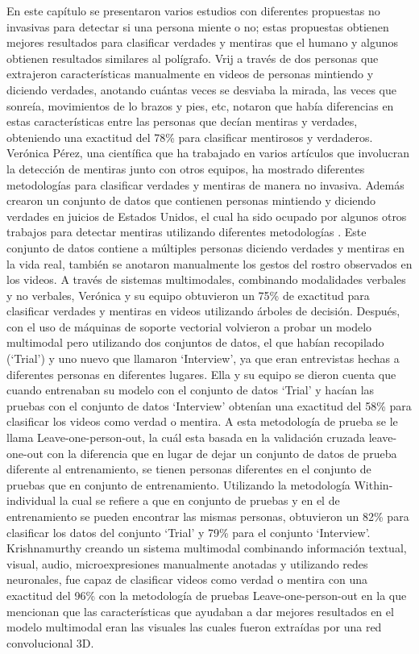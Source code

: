 \begin{onehalfspacing}
En este capítulo se presentaron varios estudios con diferentes propuestas no invasivas para detectar si una persona miente o no; estas propuestas obtienen mejores resultados para clasificar verdades y mentiras que el humano y algunos obtienen resultados similares al polígrafo. Vrij \cite{Vrij2000DetectingBehavior} a través de dos personas que extrajeron características manualmente en videos de personas mintiendo y diciendo verdades, anotando cuántas veces se desviaba la mirada, las veces que sonreía, movimientos de lo brazos y pies, etc, notaron que había diferencias en estas características entre las personas que decían mentiras y verdades, obteniendo una exactitud del 78\% para clasificar mentirosos y verdaderos. Verónica Pérez, una científica que ha trabajado en varios artículos que involucran la detección de mentiras junto con otros equipos, ha mostrado diferentes metodologías para clasificar verdades y mentiras de manera no invasiva. Además crearon un conjunto de datos que contienen personas mintiendo y diciendo verdades en juicios de Estados Unidos, el cual ha sido ocupado por algunos otros trabajos para detectar mentiras utilizando diferentes metodologías \cite{Perez-Rosas2015VerbalDetection,Abouelenien2016AnalyzingApproach}. Este conjunto de datos contiene a múltiples personas diciendo verdades y mentiras en la vida real, también se anotaron manualmente los gestos del rostro observados en los videos. A través de sistemas multimodales, combinando modalidades verbales y no verbales, Verónica y su equipo obtuvieron un 75\% de exactitud para clasificar verdades y mentiras en videos utilizando árboles de decisión. Después, con el uso de máquinas de soporte vectorial volvieron a probar un modelo multimodal pero utilizando dos conjuntos de datos, el que habían recopilado (`Trial') y uno nuevo que llamaron `Interview', ya que eran entrevistas hechas a diferentes personas en diferentes lugares. Ella y su equipo se dieron cuenta que cuando entrenaban su modelo con el conjunto de datos `Trial' y hacían las pruebas con el conjunto de datos `Interview' obtenían una exactitud del 58\% para clasificar los videos como verdad o mentira. A esta metodología de prueba se le llama Leave-one-person-out, la cuál esta basada en la validación cruzada leave-one-out con la diferencia que en lugar de dejar un conjunto de datos de prueba diferente al entrenamiento, se tienen personas diferentes en el conjunto de pruebas que en conjunto de entrenamiento. Utilizando la metodología Within-individual la cual se refiere a que en conjunto de pruebas y en el de entrenamiento se pueden encontrar las mismas personas, obtuvieron un 82\% para clasificar los datos del conjunto `Trial' y 79\% para el conjunto `Interview'. Krishnamurthy \cite{KrishnamurthyADetection} creando un sistema multimodal combinando información textual, visual, audio, microexpresiones manualmente anotadas y utilizando redes neuronales, fue capaz de clasificar videos como verdad o mentira con una exactitud del 96\% con la metodología de pruebas Leave-one-person-out en la que mencionan que las características que ayudaban a dar mejores resultados en el modelo multimodal eran las visuales las cuales fueron extraídas por una red convolucional 3D.

\end{onehalfspacing}
